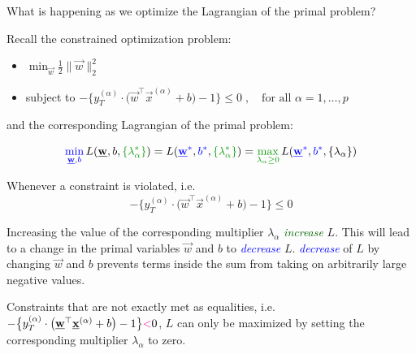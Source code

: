 \begin{frame}\frametitle{\subsecname}

What is happening as we optimize the Lagrangian of the primal problem?

Recall the constrained optimization problem:

\begin{itemize}
\item[] $\min_{\vec w} \frac{1}{2} \lVert \vec w \rVert_{2}^{2}$
\item[] subject to $-\big\{ y_{T}^{(\alpha)} \cdot \big( \vec w^{\top} \vec x^{(\alpha)} + b \big) -1 \big\} \le 0\;,\quad \text{for all } \alpha = 1,\ldots,p$
\end{itemize}

and the corresponding Lagrangian of the primal problem:




\begin{equation}
		{\color{blue}\min_{\vec w, b}}\, L{(\vec{w}, b, {\color{darkgreen} \{ \lambda_\alpha^*\}})}
		= L{({\color{blue}\vec{w}^*}, {\color{blue}b^*}, {\color{darkgreen} \{ \lambda_\alpha^*\}})}
		= {\color{darkgreen}\max_{ \lambda_\alpha \geq 0}}\, L{({\color{blue}\vec{w}^*}, {\color{blue}b^*}, \{ \lambda_\alpha \})}
\end{equation}


Whenever a constraint is violated, i.e.
\begin{equation}
-\big\{ y_{T}^{(\alpha)} \cdot \big( \vec w^{\top} \vec x^{(\alpha)} + b \big) -1 \big\} \le 0
\end{equation}

Increasing the value of the corresponding multiplier $\lambda_\alpha$ \emph{\textcolor{darkgreen}{increase}} $L$. 
This will lead to a change in the primal variables $\vec w$ and $b$ to \emph{\textcolor{blue}{decrease}} $L$.
\emph{\textcolor{blue}{decrease}} of $L$ by changing $\vec w$ and $b$ prevents terms inside the sum from taking on arbitrarily large negative values.

Constraints that are not exactly met as equalities, i.e. $-\big\{ y_{T}^{(\alpha)} \cdot \big( \vec w^{\top} \vec x^{(\alpha)} + b \big) -1 \big\} {\color{magenta}{<}} 0$, $L$ can only be maximized by setting the corresponding multiplier $\lambda_\alpha$ to zero.


\end{frame}

